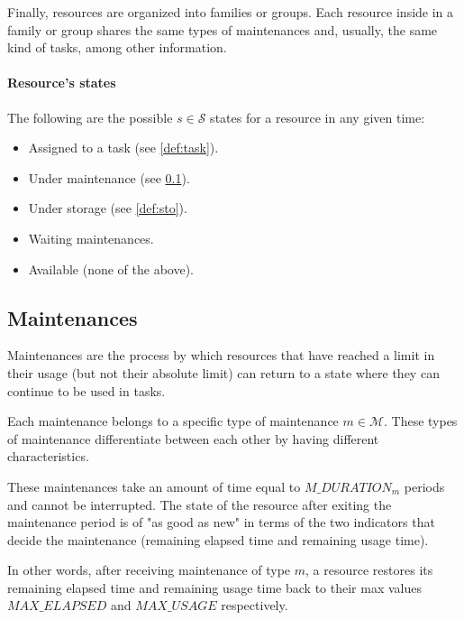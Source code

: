 \documentclass{roadef}
\begin{document}
    Finally, resources are organized into families or groups. Each resource inside in a family or group shares the same types of maintenances and, usually, the same kind of tasks, among other information.

    \paragraph{Resource's states}
    \label{def:res-state}

    The following are the possible $s \in \mathcal{S}$ states for a resource in any given time:

    \begin{itemize}
        \item Assigned to a task (see \ref{def:task}).
        \item Under maintenance (see \ref{def:maint}).
        \item Under storage (see \ref{def:sto}).
        \item Waiting maintenances.
        \item Available (none of the above).
    \end{itemize}

    \subsection{Maintenances}
    \label{def:maint}

    Maintenances are the process by which resources that have reached a limit in their usage (but not their absolute limit) can return to a state where they can continue to be used in tasks.

    Each maintenance belongs to a specific type of maintenance $m \in \mathcal{M}$. These types of maintenance differentiate between each other by having different characteristics.

    These maintenances take an amount of time equal to $M\_DURATION_m$ periods and cannot be interrupted. The state of the resource after exiting the maintenance period is of "as good as new" in terms of the two indicators that decide the maintenance (remaining elapsed time and remaining usage time).
    
    In other words, after receiving maintenance of type $m$, a resource restores its remaining elapsed time and remaining usage time back to their max values $MAX\_ELAPSED$ and $MAX\_USAGE$ respectively.
\end{document}
